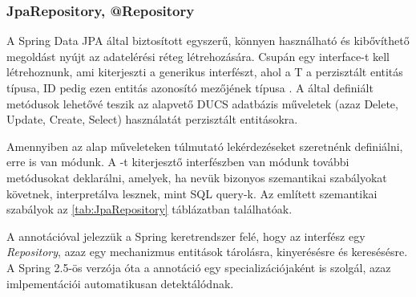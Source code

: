 \subsubsection{JpaRepository, @Repository}

A Spring Data JPA által biztosított  egyszerű, könnyen használható és kibővíthető megoldást nyújt az adatelérési réteg létrehozására. Csupán egy interface-t kell létrehoznunk, ami kiterjeszti a  generikus interfészt, ahol a T a perzisztált entitás típusa, ID pedig ezen entitás azonosító mezőjének típusa \cite{jpaRepositoryDocumentation}. A  által definiált metódusok lehetővé teszik az alapvető  DUCS adatbázis műveletek (azaz Delete, Update, Create, Select) használatát perzisztált entitásokra. \par

Amennyiben az alap műveleteken túlmutató lekérdezéseket szeretnénk definiálni, erre is van módunk. A -t kiterjesztő interfészben van módunk további metódusokat deklarálni, amelyek, ha nevük bizonyos szemantikai szabályokat követnek, interpretálva lesznek, mint SQL query-k. Az említett szemantikai szabályok az \ref{tab:JpaRepository} táblázatban találhatóak. \par

A  annotációval jelezzük a Spring keretrendszer felé, hogy az interfész egy \emph{Repository}, azaz egy mechanizmus entitások tárolásra, kinyerésésre és keresésésre. A Spring 2.5-ös verzója óta a  annotáció egy specializációjaként is szolgál, azaz imlpementációi automatikusan detektálódnak.

